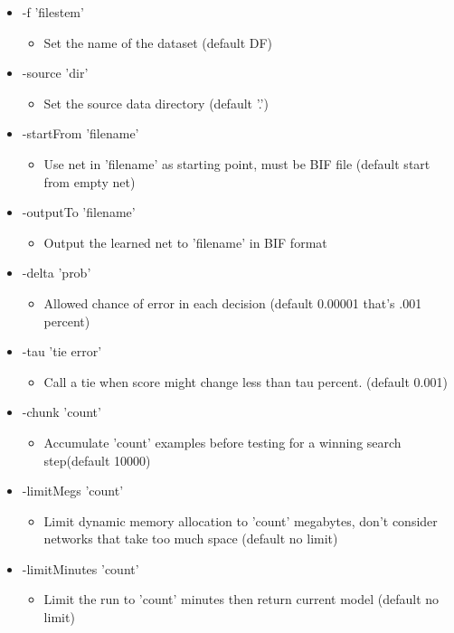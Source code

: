 \begin{itemize}
\item -f 'filestem'\begin{itemize}
\item Set the name of the dataset (default DF)\end{itemize}
\item -source 'dir'\begin{itemize}
\item Set the source data directory (default '.')\end{itemize}
\item -start\-From 'filename'\begin{itemize}
\item Use net in 'filename' as starting point, must be BIF file (default start from empty net)\end{itemize}
\item -output\-To 'filename'\begin{itemize}
\item Output the learned net to 'filename' in BIF format\end{itemize}
\item -delta 'prob'\begin{itemize}
\item Allowed chance of error in each decision (default 0.00001 that's .001 percent)\end{itemize}
\item -tau 'tie error'\begin{itemize}
\item Call a tie when score might change less than tau percent. (default 0.001)\end{itemize}
\item -chunk 'count'\begin{itemize}
\item Accumulate 'count' examples before testing for a winning search step(default 10000)\end{itemize}
\item -limit\-Megs 'count'\begin{itemize}
\item Limit dynamic memory allocation to 'count' megabytes, don't consider networks that take too much space (default no limit)\end{itemize}
\item -limit\-Minutes 'count'\begin{itemize}
\item Limit the run to 'count' minutes then return current model (default no limit)\end{itemize}

\end{itemize}
